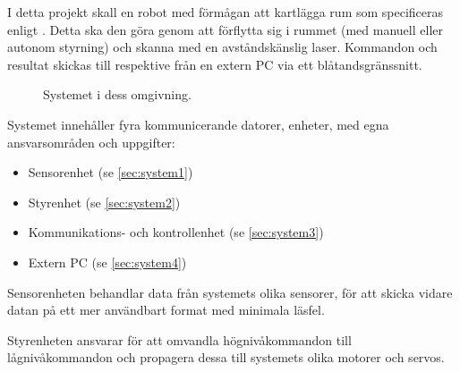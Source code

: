 

I detta projekt skall en robot med förmågan att kartlägga rum som specificeras enligt \cite{coursespec}. Detta ska den göra genom att förflytta sig i rummet (med manuell eller autonom styrning) och skanna med en avståndskänslig laser. Kommandon och resultat skickas till respektive från en extern PC via ett blåtandsgränssnitt.

\begin{figure}[h!]
    \caption{Systemet i dess omgivning.}
    \label{fig:overview}
\end{figure}

\noindent
Systemet innehåller fyra kommunicerande datorer, enheter, med egna ansvarsområden och uppgifter:

\begin{itemize}
\item Sensorenhet (se \ref{sec:system1})
\item Styrenhet (se \ref{sec:system2})
\item Kommunikations- och kontrollenhet (se \ref{sec:system3})
\item Extern PC (se \ref{sec:system4})
\end{itemize}

\noindent
Sensorenheten behandlar data från systemets olika sensorer, för att skicka vidare datan på ett mer användbart format med minimala läsfel.

Styrenheten ansvarar för att omvandla högnivåkommandon till lågnivåkommandon och propagera dessa till systemets olika motorer och servos.

